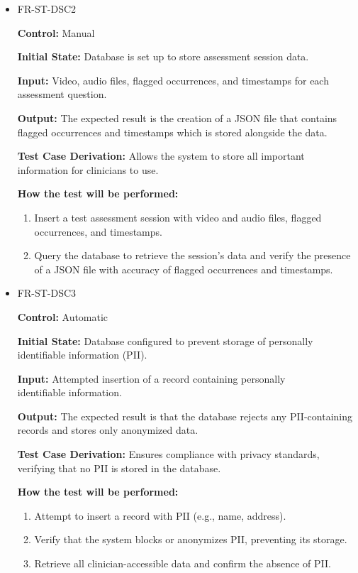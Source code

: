 \documentclass[12pt, titlepage]{article}
\begin{document}
\begin{itemize}
  \item FR-ST-DSC2
  \begin{mdframed}[linewidth=0.5mm]
      \textbf{Control:} Manual \par
      \textbf{Initial State:} Database is set up to store assessment session data. \par
      \textbf{Input:} Video, audio files, flagged occurrences, and timestamps for each assessment question. \par
      \textbf{Output:} The expected result is the creation of a JSON file that contains flagged occurrences and timestamps which is stored alongside the data. \par
      \textbf{Test Case Derivation:} Allows the system to store all important information for clinicians to use. \par
      \textbf{How the test will be performed:}
      \begin{enumerate}[noitemsep]
        \item Insert a test assessment session with video and audio files, flagged \\ occurrences, and timestamps.
        \item Query the database to retrieve the session’s data and verify the presence of a JSON file with accuracy of flagged occurrences and timestamps.
      \end{enumerate}
  \end{mdframed}

  \item FR-ST-DSC3
  \begin{mdframed}[linewidth=0.5mm]
      \textbf{Control:} Automatic \par
      \textbf{Initial State:} Database configured to prevent storage of personally identifiable information (PII). \par
      \textbf{Input:} Attempted insertion of a record containing personally \\identifiable information. \par
      \textbf{Output:} The expected result is that the database rejects any PII-containing records and stores only anonymized data. \par
      \textbf{Test Case Derivation:} Ensures compliance with privacy standards, verifying that no PII is stored in the database. \par
      \textbf{How the test will be performed:}
      \begin{enumerate}[noitemsep]
        \item Attempt to insert a record with PII (e.g., name, address).
        \item Verify that the system blocks or anonymizes PII, preventing its storage.
        \item Retrieve all clinician-accessible data and confirm the absence of PII.
      \end{enumerate}
  \end{mdframed}


\end{itemize}
\end{document}
